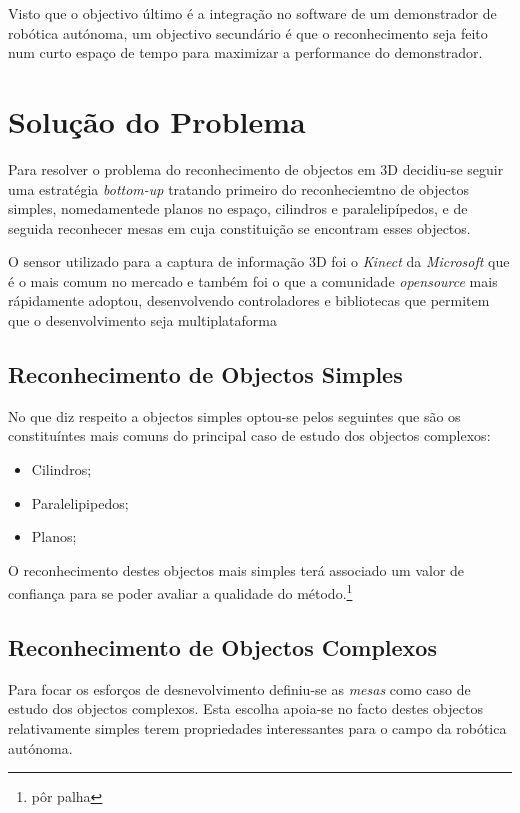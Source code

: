 Visto que o objectivo último é a integração no software de um demonstrador de robótica autónoma,
um objectivo secundário é que o reconhecimento seja feito num curto espaço de tempo para maximizar
a performance do demonstrador.




\section{ Solução do Problema}

Para resolver o problema do reconhecimento de objectos em 3D decidiu-se seguir uma estratégia \emph{bottom-up}
tratando primeiro do reconheciemtno de objectos simples, nomedamentede planos no espaço, cilindros e paralelipípedos,
e de seguida reconhecer mesas em cuja constituição se encontram esses objectos.

O sensor utilizado para a captura de informação 3D foi o \emph{Kinect} da \emph{Microsoft} que é o mais comum no mercado
e também foi o que a comunidade \emph{opensource} mais rápidamente adoptou, desenvolvendo controladores e bibliotecas
que permitem que o desenvolvimento seja multiplataforma


\subsection{Reconhecimento de Objectos Simples}

No que diz respeito a objectos simples optou-se pelos seguintes que são os constituíntes mais comuns
do principal caso de estudo dos objectos complexos:
\begin{itemize}
\item Cilindros;
\item Paralelipipedos;
\item Planos;
\end{itemize}

O reconhecimento destes objectos mais simples terá associado um valor de confiança para se poder
avaliar a qualidade do método.\footnote{pôr palha}
 
\subsection{Reconhecimento de Objectos Complexos}

Para focar os esforços de desnevolvimento definiu-se as \emph{mesas} como caso de estudo dos objectos
complexos. Esta escolha apoia-se no facto destes objectos relativamente simples terem
propriedades interessantes para o campo da robótica autónoma.

